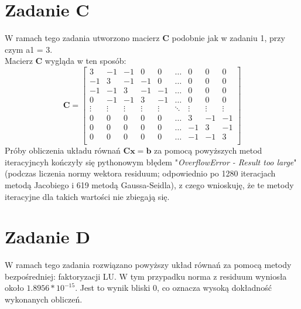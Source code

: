 \documentclass{article} %
\begin{document}
\section{Zadanie C}
W ramach tego zadania utworzono macierz \textbf{C} podobnie jak w zadaniu 1, przy czym a1 = 3. \\
Macierz \textbf{C} wygląda w ten sposób: \\
\[
\textbf{C} = 
\begin{bmatrix}
    3 & -1 & -1 & 0 & 0 &\dots & 0 & 0 & 0 \\
    -1 & 3 & -1 & -1 & 0 & \dots & 0 & 0 & 0\\
    -1 & -1 & 3 & -1 & -1 & \dots & 0 & 0 & 0 \\
    0 & -1 & -1 & 3 & -1 & \dots & 0 & 0 & 0 \\
    \vdots & \vdots & \vdots & \vdots & \vdots & \ddots & \vdots & \vdots & \vdots \\
    0 & 0 & 0 & 0 & 0 & \dots & 3 & -1 & -1 \\
    0 & 0 & 0 & 0 & 0 & \dots & -1 & 3 & -1 \\
    0 & 0 & 0 & 0 & 0 & \dots & -1 & -1 & 3 \\
\end{bmatrix}
\]
Próby obliczenia układu równań \(\mathbf{Cx}=\mathbf{b}\) 
za pomocą powyższych metod iteracyjncyh kończyły się pythonowym błędem "\textit{OverflowError - Result too large}" 
(podczas liczenia normy wektora residuum; odpowiednio po 1280 iteracjach metodą Jacobiego i 619 metodą Gaussa-Seidla),
z czego wnioskuję, że te metody iteracyjne dla takich wartości nie zbiegają się.
\section{Zadanie D}
W ramach tego zadania rozwiązano powyższy układ równań za pomocą
 metody bezpośredniej: faktoryzacji LU. 
W tym przypadku norma z residuum wyniosła około \(1.8956*10^{-15}\).
Jest to wynik bliski 0, co oznacza wysoką dokładność wykonanych obliczeń.
 \newpage
\end{document}
